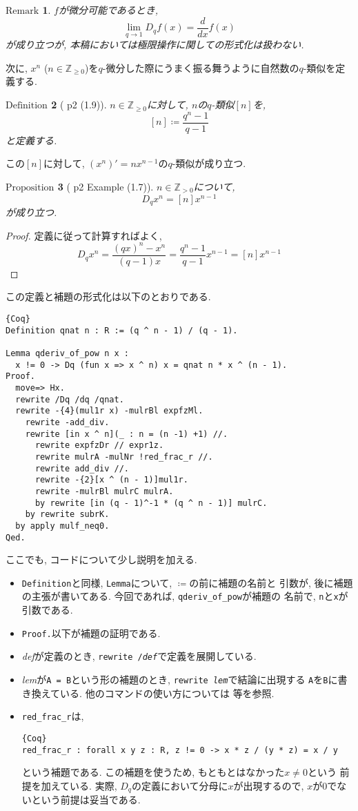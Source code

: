 \documentclass[11pt]{jarticle}
\theoremstyle{mystyle}
\newtheorem{df}{$\textrm{Definition}$}[subsection]
\newtheorem{prop}[df]{$\textrm{Proposition}$}
\newtheorem{rmk}[df]{$\textrm{Remark}$}
\newcommand{\bdf}{\begin{shadebox} \begin{df}}
\newcommand{\edf}{\end{df} \end{shadebox}}
\newcommand{\bprop}{\begin{shadebox} \begin{prop}}
\newcommand{\eprop}{\end{prop} \end{shadebox}}
\newcommand{\brmk}{\begin{rmk}}
\newcommand{\ermk}{\end{rmk}}
\newcommand{\bpf}{\begin{proof}}
\newcommand{\epf}{\end{proof}}
\newcommand{\Z}{\mathbb{Z}}
\newcommand{\ra}{\rightarrow}
\newcommand{\0}{\textbf{0}}
\newcommand{\1}{\textbf{1}}
\newcommand{\2}{\textbf{2}}
\begin{document}
\brmk
  $f$が微分可能であるとき, 
  \[
    \lim_{q\ra1} D_qf(x) = \frac{d}{dx}f(x)
  \] 
  が成り立つが, 本稿においては極限操作に関しての形式化は扱わない. 
\ermk
次に, $x ^ n$ ($n \in \Z_{\ge 0}$)を$q$-微分した際にうまく振る舞うように自然数の$q$-類似を定義する. 
\bdf[\cite{Kac} p2 (1.9)]
  $n \in \Z_{\ge 0}$に対して, $n$の$q$-類似$[n]$を, 
  \[
    [n] \coloneqq \frac{q^n - 1}{q - 1}
  \]
  と定義する. 
\edf
この$[n]$に対して, $(x^n)' = n x^{n-1}$の$q$-類似が成り立つ.
\bprop[\cite{Kac} p2 Example (1.7)]
  $n \in \Z_{>0}$について, 
  \[
    D_q x^n = [n] x ^{n - 1}
  \]
  が成り立つ. 
\eprop
\bpf
  定義に従って計算すればよく, 
  \[
    D_q x ^ n = \frac{(qx) ^ n - x ^ n}{(q - 1) x}
                 = \frac{q^n - 1}{q - 1} x ^ {n - 1}
                 = [n] x ^ {n - 1}
  \] 
\epf
この定義と補題の形式化は以下のとおりである. 
\begin{lstlisting}{Coq}
Definition qnat n : R := (q ^ n - 1) / (q - 1).

Lemma qderiv_of_pow n x :
  x != 0 -> Dq (fun x => x ^ n) x = qnat n * x ^ (n - 1).
Proof.
  move=> Hx.
  rewrite /Dq /dq /qnat.
  rewrite -{4}(mul1r x) -mulrBl expfzMl.
    rewrite -add_div.
    rewrite [in x ^ n](_ : n = (n -1) +1) //.
      rewrite expfzDr // expr1z.
      rewrite mulrA -mulNr !red_frac_r //.
      rewrite add_div //.
      rewrite -{2}[x ^ (n - 1)]mul1r.
      rewrite -mulrBl mulrC mulrA.
      by rewrite [in (q - 1)^-1 * (q ^ n - 1)] mulrC.
    by rewrite subrK.
  by apply mulf_neq0.
Qed.
\end{lstlisting}
ここでも, コードについて少し説明を加える. 
\begin{itemize}
  \item {\tt Definition}と同様, {\tt Lemma}について, {\tt $\coloneqq$}の前に補題の名前と
          引数が, 後に補題の主張が書いてある. 今回であれば, {\tt qderiv\_of\_pow}が補題の
          名前で, {\tt n}と{\tt x}が引数である. 
  \item {\tt Proof.}以下が補題の証明である. 
  \item {\it def}が定義のとき, {\tt rewrite /{\it def}}で定義を展開している. 
  \item {\it lem}が{\tt A = B}という形の補題のとき, {\tt rewrite {\it lem}}で結論に出現する
          {\tt A}を{\tt B}に書き換えている. 他のコマンドの使い方については \cite{Gar}等を参照. 
  \item {\tt red\_frac\_r}は, 
           \begin{lstlisting}{Coq}
red_frac_r : forall x y z : R, z != 0 -> x * z / (y * z) = x / y \end{lstlisting}
           という補題である. この補題を使うため, もともとはなかった{\tt $x \ne 0$}という
           前提を加えている. 実際, $D_q$の定義において分母に$x$が出現するので, 
           $x$が$0$でないという前提は妥当である.  
\end{itemize}
\end{document}
